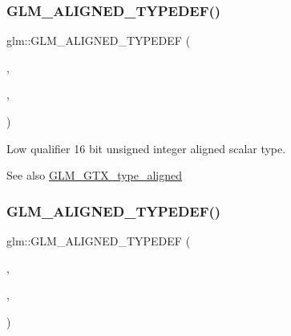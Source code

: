 \subsubsection{\texorpdfstring{G\+L\+M\+\_\+\+A\+L\+I\+G\+N\+E\+D\+\_\+\+T\+Y\+P\+E\+D\+E\+F()}{GLM\_ALIGNED\_TYPEDEF()}\hspace{0.1cm}{\footnotesize\ttfamily [78/209]}}
{\footnotesize\ttfamily glm\+::\+G\+L\+M\+\_\+\+A\+L\+I\+G\+N\+E\+D\+\_\+\+T\+Y\+P\+E\+D\+EF (\begin{DoxyParamCaption}\item[{\mbox{\hyperlink{group__gtc__type__precision_ga22c5364f27caa0a6eb0627cbc21e46be}{lowp\+\_\+u16}}}]{,  }\item[{aligned\+\_\+lowp\+\_\+u16}]{,  }\item[{2}]{ }\end{DoxyParamCaption})}

Low qualifier 16 bit unsigned integer aligned scalar type. \begin{DoxySeeAlso}{See also}
\mbox{\hyperlink{group__gtx__type__aligned}{G\+L\+M\+\_\+\+G\+T\+X\+\_\+type\+\_\+aligned}} 
\end{DoxySeeAlso}
\mbox{\label{group__gtx__type__aligned_ga31ba41fd896257536958ec6080203d2a}} 
\subsubsection{\texorpdfstring{G\+L\+M\+\_\+\+A\+L\+I\+G\+N\+E\+D\+\_\+\+T\+Y\+P\+E\+D\+E\+F()}{GLM\_ALIGNED\_TYPEDEF()}\hspace{0.1cm}{\footnotesize\ttfamily [79/209]}}
{\footnotesize\ttfamily glm\+::\+G\+L\+M\+\_\+\+A\+L\+I\+G\+N\+E\+D\+\_\+\+T\+Y\+P\+E\+D\+EF (\begin{DoxyParamCaption}\item[{\mbox{\hyperlink{group__gtc__type__precision_gaba06fae1dd98ca50c017e68345df0365}{lowp\+\_\+u32}}}]{,  }\item[{aligned\+\_\+lowp\+\_\+u32}]{,  }\item[{4}]{ }\end{DoxyParamCaption})}

